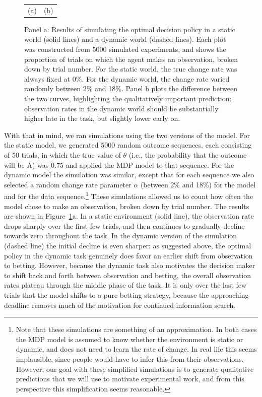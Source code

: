 \documentclass[authoryear]{elsarticle}
\begin{document}
\begin{figure}[t]
\begin{center}
\begin{tabular}{cc}
(a) & (b)
\end{tabular}
\caption{Panel a: Results of simulating the optimal decision policy in a static world (solid lines) and a dynamic world (dashed lines). Each plot was constructed from 5000 simulated experiments, and shows the proportion of trials on which the agent makes an observation, broken down by trial number.  For the static world, the true change rate was always fixed at 0\%. For the dynamic world, the change rate varied randomly between 2\% and 18\%. Panel b plots the difference between the two curves, highlighting the qualitatively important prediction: observation rates in the dynamic world should be substantially higher late in the task, but slightly lower early on.}
\label{fig:qualitativeprediction}
\end{center}
\end{figure}

With that in mind, we ran simulations using the two versions of the model. For the static model, we generated 5000 random outcome sequences, each consisting of 50 trials, in which the true value of $\theta$ (i.e., the probability that the outcome will be A) was 0.75 and applied the MDP model to that sequence. For the dynamic model the simulation was similar, except that for each sequence we also selected a random change rate parameter $\alpha$ (between 2\% and 18\%) for the model and for the data sequence.\footnote{Note that these simulations are something of an approximation. In both cases the MDP model is assumed to know whether the environment is static or dynamic, and does not need to learn the rate of change. In real life this seems implausible, since people would have to infer this from their observations. However, our goal with these simplified simulations is to generate qualitative predictions that we will use to motivate experimental work, and from this perspective this simplification seems reasonable.} These simulations allowed us to count how often the model chose to make an observation, broken down by trial number. The results are shown in Figure~\ref{fig:qualitativeprediction}a. In a static environment (solid line), the observation rate drops sharply over the first few trials, and then continues to gradually decline towards zero throughout the task. In the dynamic version of the simulation (dashed line) the initial decline is even sharper: as suggested above, the optimal policy in the dynamic task genuinely does favor an earlier shift from observation to betting. However, because the dynamic task also motivates the decision maker to shift back and forth between observation and betting, the overall observation rates plateau through the middle phase of the task. It is only over the last few trials that the model shifts to a pure betting strategy, because the approaching deadline removes much of the motivation for continued information search.
\end{document}
